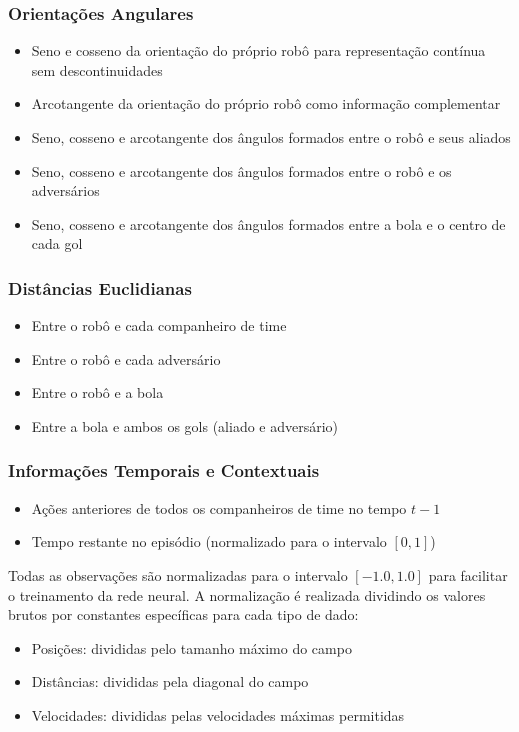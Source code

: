 \subsubsection{Orientações Angulares}
\begin{itemize}
    \item Seno e cosseno da orientação do próprio robô para representação contínua sem descontinuidades
    \item Arcotangente da orientação do próprio robô como informação complementar
    \item Seno, cosseno e arcotangente dos ângulos formados entre o robô e seus aliados
    \item Seno, cosseno e arcotangente dos ângulos formados entre o robô e os adversários
    \item Seno, cosseno e arcotangente dos ângulos formados entre a bola e o centro de cada gol
\end{itemize}

\subsubsection{Distâncias Euclidianas}
\begin{itemize}
    \item Entre o robô e cada companheiro de time
    \item Entre o robô e cada adversário
    \item Entre o robô e a bola
    \item Entre a bola e ambos os gols (aliado e adversário)
\end{itemize}

\subsubsection{Informações Temporais e Contextuais}
\begin{itemize}
    \item Ações anteriores de todos os companheiros de time no tempo $t-1$
    \item Tempo restante no episódio (normalizado para o intervalo $[0,1]$)
\end{itemize}

Todas as observações são normalizadas para o intervalo $[-1.0, 1.0]$ para facilitar o treinamento da rede neural. A normalização é realizada dividindo os valores brutos por constantes específicas para cada tipo de dado:
\begin{itemize}
    \item Posições: divididas pelo tamanho máximo do campo
    \item Distâncias: divididas pela diagonal do campo
    \item Velocidades: divididas pelas velocidades máximas permitidas
\end{itemize}

